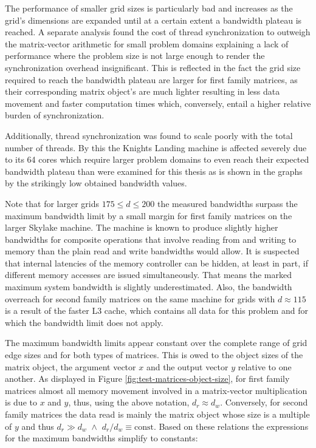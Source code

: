      The performance of smaller grid sizes is particularly bad and increases as the grid's dimensions are expanded until
     at a certain extent a bandwidth plateau is reached. A separate analysis found the cost of thread synchronization to
     outweigh the matrix-vector arithmetic for small problem domains explaining a lack of performance where the
     problem size is not large enough to render the synchronization overhead insignificant. This is reflected in the fact
     the grid size required to reach the bandwidth plateau are larger for first family matrices, as their corresponding
     matrix object's are much lighter resulting in less data movement and faster computation times which, conversely,
     entail a higher relative burden of synchronization.
 
     Additionally, thread synchronization was found to scale poorly with the total number of threads. By this the Knights
     Landing machine is affected severely due to its 64 cores which require larger problem domains to even reach their
     expected bandwidth plateau than were examined for this thesis as is shown in the graphs by the strikingly low
     obtained bandwidth values.
 
     Note that for larger grids $175 \leq d \leq 200$ the measured bandwidths surpass the maximum bandwidth limit by a
     small margin for first family matrices on the larger Skylake machine. The machine is known to produce slightly
     higher bandwidths for composite operations that involve reading from and writing to memory than the plain read and
     write bandwidths would allow. It is suspected that internal latencies of the memory controller can be hidden, at
     least in part, if different memory accesses are issued simultaneously. That means the marked maximum system
     bandwidth is slightly underestimated. Also, the bandwidth overreach for second family matrices on the same machine
     for grids with $d \approx 115$ is a result of the faster L3 cache, which contains all data for this problem and for
     which the bandwidth limit does not apply.
 
     The maximum bandwidth limits appear constant over the complete range of grid edge sizes and for both types of
     matrices. This is owed to the object sizes of the matrix object, the argument vector $x$ and the output vector $y$
     relative to one another. As displayed in Figure \ref{fig:test-matrices-object-size}, for first family matrices
     almost all memory movement involved in a matrix-vector multiplication is due to $x$ and $y$, thus, using the above
     notation, $d_r \approx d_w$. Conversely, for second family matrices the data read is mainly the matrix object whose
     size is a multiple of $y$ and thus $d_r \gg d_w \,\, \land \,\, d_r/d_w \equiv \text{const}$. Based on these
     relations the expressions for the maximum bandwidths simplify to constants:
 
